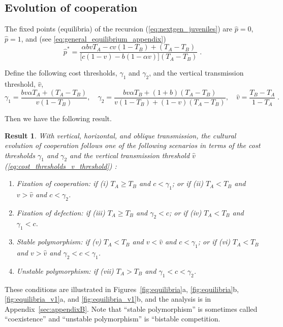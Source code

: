 \documentclass[12pt]{extarticle}
\newtheorem{result}{Result}
\begin{document}
\subsection*{Evolution of cooperation}

The fixed points (equilibria) of  the recursion (\autoref{eq:nextgen_juveniles}) are $\hat p=0$, $\hat p=1$, and (see \autoref{eq:general_equilibrium_appendix})
\begin{equation} \label{eq:general_equilibrium}
  \hat{p}^* =  
  \frac{\alpha bvT_A - cv(1-T_B) + (T_A-T_B)}{\big[c(1-v) - b (1-\alpha v)\big] (T_A-T_B)} \;.
\end{equation}

Define the following cost thresholds, $\gamma_1$ and $\gamma_2$, and the vertical transmission threshold, $\hat v$,
\begin{equation} \label{eq:cost_thresholds_v_threshold} 
\gamma_1 = \frac{b v \alpha T_A + (T_A - T_B)}{v(1-T_B)}, \quad
\gamma_2 = \frac{b v \alpha T_B + (1+b) (T_A - T_B)}{v(1-T_B) + (1-v)(T_A-T_B)}, \quad
\hat v = \frac{T_B - T_A}{1-T_A} \;.
\end{equation}

Then we have the following result.
\\

\begin{result}%
\label{result:vert_obli_hori}
With vertical, horizontal, and oblique transmission, the cultural evolution of cooperation follows one of the following scenarios in terms of the cost thresholds $\gamma_1$ and $\gamma_2$ and the vertical transmission threshold $\hat v$ (\autoref{eq:cost_thresholds_v_threshold}) :

\begin{enumerate}
\item \emph{Fixation of cooperation}: 
	if \emph{(i)} $T_A \ge T_B$ and $c < \gamma_1$; or 
	if \emph{(ii)} $T_A < T_B$ and $v>\hat v$ and $c < \gamma_2$.
\item \emph{Fixation of defection}: 
    if \emph{(iii)} $T_A \ge T_B$ and $\gamma_2 < c$; or 
	if \emph{(iv)} $T_A < T_B$ and $\gamma_1 < c$.
\item \emph{Stable polymorphism}: 
    if \emph{(v)} $T_A < T_B$ and $v<\hat{v}$ and $c < \gamma_1$; or 
    if \emph{(vi)} $T_A < T_B$ and $v>\hat{v}$ and $\gamma_2 < c < \gamma_1$.
\item \emph{Unstable polymorphism}:
    if \emph{(vii)} $T_A > T_B$ and $\gamma_1 < c < \gamma_2$.
\end{enumerate}

\end{result}
These conditions are illustrated in Figures~\ref{fig:equilibria}a, \ref{fig:equilibria}b, \ref{fig:equilibria_v1}a, and \ref{fig:equilibria_v1}b, and the analysis is in Appendix~\ref{sec:appendixB}.
Note that “stable polymorphism” is sometimes called “coexistence” and “unstable polymorphism” is “bistable competition.
\end{document}
